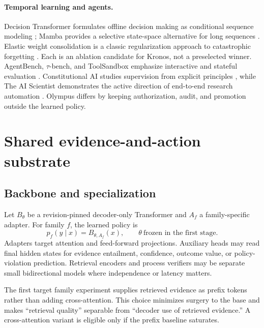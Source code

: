 \documentclass[10pt]{article}
\begin{document}
\paragraph{Temporal learning and agents.} Decision Transformer formulates
offline decision making as conditional sequence modeling
\citep{chen2021decision}; Mamba provides a selective state-space alternative
for long sequences \citep{gu2023mamba}. Elastic weight consolidation is a
classic regularization approach to catastrophic forgetting
\citep{kirkpatrick2016ewc}. Each is an ablation candidate for Kronos, not a
preselected winner. AgentBench, $\tau$-bench, and ToolSandbox emphasize
interactive and stateful evaluation
\citep{liu2023agentbench,yao2024taubench,lu2024toolsandbox}. Constitutional AI studies supervision from explicit
principles \citep{bai2022constitutional}, while The AI Scientist demonstrates
the active direction of end-to-end research automation
\citep{lu2024aiscientist}. Olympus differs by keeping authorization, audit, and
promotion outside the learned policy.

\section{Shared evidence-and-action substrate}

\subsection{Backbone and specialization}

Let $B_\theta$ be a revision-pinned decoder-only Transformer and $A_f$ a
family-specific adapter. For family $f$, the learned policy is
\begin{equation}
p_f(y\mid x)=B_{\theta,A_f}(x), \qquad \theta\ \text{frozen in the first stage}.
\end{equation}
Adapters target attention and feed-forward projections. Auxiliary heads may
read final hidden states for evidence entailment, confidence, outcome value, or
policy-violation prediction. Retrieval encoders and process verifiers may be
separate small bidirectional models where independence or latency matters.

The first target family experiment supplies retrieved evidence as prefix tokens rather
than adding cross-attention. This choice minimizes surgery to the base and makes
``retrieval quality'' separable from ``decoder use of retrieved evidence.'' A
cross-attention variant is eligible only if the prefix baseline saturates.
\end{document}
